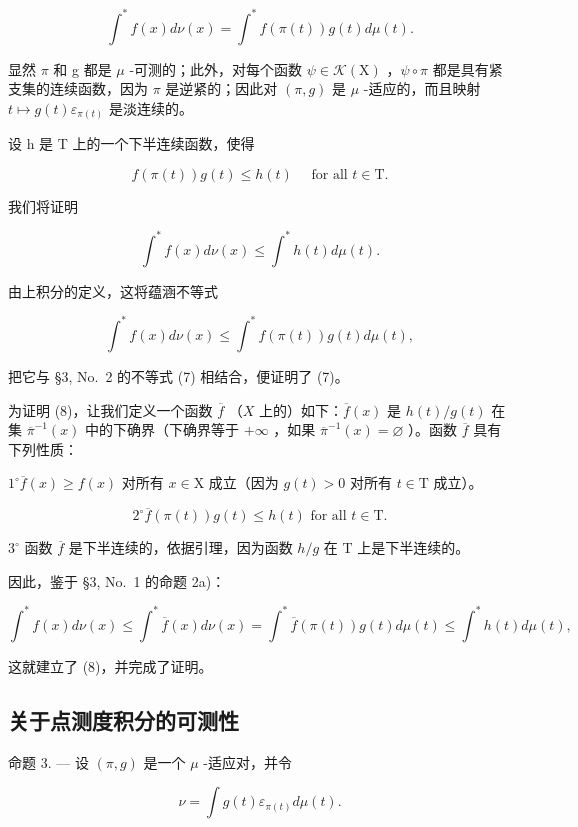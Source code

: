 \[
\int^ {*} f (x) d \nu (x) = \int^ {*} f (\pi (t)) g (t) d \mu (t).\tag{7}
\]

显然 \(\pi\) 和 g 都是 \(\mu\) -可测的；此外，对每个函数 \(\psi \in \mathcal{K}(\mathrm{X})\) ，\(\psi \circ \pi\) 都是具有紧支集的连续函数，因为 \(\pi\) 是逆紧的；因此对 \((\pi, g)\) 是 \(\mu\) -适应的，而且映射 \(t \mapsto g(t) \varepsilon_{\pi(t)}\) 是淡连续的。

设 h 是 T 上的一个下半连续函数，使得

\[
f (\pi (t)) g (t) \leqslant h (t) \quad \text { for   all } t \in \mathrm{T}.
\]

我们将证明

\[
\int^ {*} f (x) d \nu (x) \leqslant \int^ {*} h (t) d \mu (t).\tag{8}
\]

由上积分的定义，这将蕴涵不等式

\[
\int^ {*} f (x) d \nu (x) \leqslant \int^ {*} f (\pi (t)) g (t) d \mu (t),
\]

把它与 §3, No.~2 的不等式 (7) 相结合，便证明了 (7)。

为证明 (8)，让我们定义一个函数 \(\overline{f}\) （\(X\) 上的）如下：\(\overline{f}(x)\) 是 \(h(t) / g(t)\) 在集 \(\overline{\pi}^{-1}(x)\) 中的下确界（下确界等于 \(+\infty\) ，如果 \(\overline{\pi}^{-1}(x) = \varnothing\) ）。函数 \(\overline{f}\) 具有下列性质：

\(1^{\circ}\overline{f} (x)\geqslant f(x)\) 对所有 \(x\in \mathrm{X}\) 成立（因为 \(g(t) > 0\) 对所有 \(t\in \mathrm{T}\) 成立）。

\[
2 ^ {\circ} \overline {{f}} (\pi (t)) g (t) \leqslant h (t) \text {   for   all   } t \in \mathrm{T}.
\]

\(3^{\circ}\) 函数 \(\overline{f}\) 是下半连续的，依据引理，因为函数 \(h / g\) 在 T 上是下半连续的。

因此，鉴于 §3, No.~1 的命题 2a)：

\[
\int^ {*} f (x) d \nu (x) \leqslant \int^ {*} \overline {{{f}}} (x) d \nu (x) = \int^ {*} \overline {{{f}}} (\pi (t)) g (t) d \mu (t) \leqslant \int^ {*} h (t) d \mu (t),
\]

这就建立了 (8)，并完成了证明。

\subsection{关于点测度积分的可测性}

命题 3. --- 设 \((\pi, g)\) 是一个 \(\mu\) -适应对，并令

\[
\nu = \int g (t) \varepsilon_ {\pi (t)} d \mu (t).
\]

